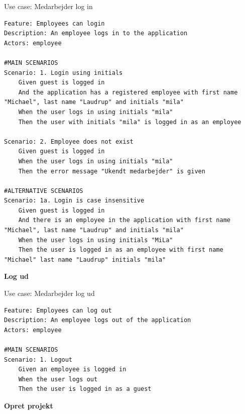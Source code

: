 \begin{listing}[H]
    \centering
    \caption{Use case: Medarbejder log in}\label{lst:usecase_login}
    \begin{verbatim}  
Feature: Employees can login
Description: An employee logs in to the application
Actors: employee

#MAIN SCENARIOS
Scenario: 1. Login using initials
    Given guest is logged in
    And the application has a registered employee with first name "Michael", last name "Laudrup" and initials "mila"
    When the user logs in using initials "mila" 
    Then the user with initials "mila" is logged in as an employee

Scenario: 2. Employee does not exist
    Given guest is logged in
    When the user logs in using initials "mila" 
    Then the error message "Ukendt medarbejder" is given 

#ALTERNATIVE SCENARIOS
Scenario: 1a. Login is case insensitive
    Given guest is logged in
    And there is an employee in the application with first name "Michael", last name "Laudrup" and initials "mila" 
    When the user logs in using initials "MiLa" 
    Then the user is logged in as an employee with first name "Michael" last name "Laudrup" initials "mila" 
    \end{verbatim}
\end{listing}
\textbf{Log ud}
\begin{listing}[H]
    \centering
    \caption{Use case: Medarbejder log ud}\label{lst:usecase_logout}
    \begin{verbatim}  
Feature: Employees can log out
Description: An employee logs out of the application
Actors: employee

#MAIN SCENARIOS
Scenario: 1. Logout
    Given an employee is logged in
    When the user logs out
    Then the user is logged in as a guest
    \end{verbatim}
\end{listing}
\textbf{Opret projekt}
